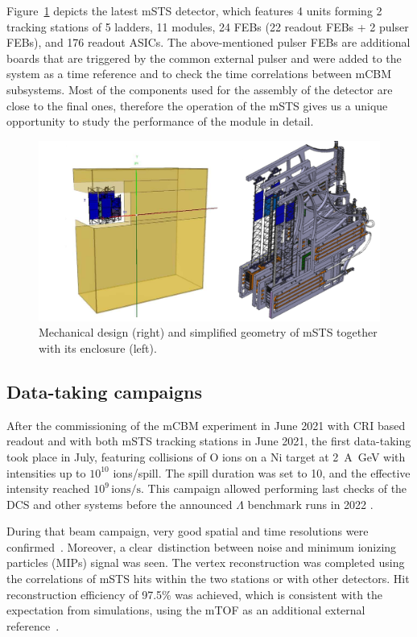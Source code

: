 Figure~\ref{fig_mSTS} depicts the latest \gls{mSTS} detector, which features \num{4} units forming \num{2} tracking stations of \num{5} ladders, \num{11} modules, \num{24} \glspl{FEB} (\num{22} readout \glspl{FEB} + \num{2} pulser \glspl{FEB}), and \num{176} readout \glspl{ASIC}. The above-mentioned pulser \glspl{FEB} are additional boards that are triggered by the common external pulser and were added to the system as a time reference and to check the time correlations between \gls{mCBM} subsystems.  Most of the components used for the assembly of the detector are close to the final ones, therefore the operation of the \gls{mSTS} gives us a unique opportunity to study the performance of the module in detail.
\begin{figure}[!h]
\centering
\includegraphics[width=0.75\columnwidth]{Chapter6/DCS/images/mSTS_mech.png}
\caption{Mechanical design (right) and simplified geometry of \gls{mSTS} together with its enclosure (left).}
\label{fig_mSTS}
\end{figure}
\newpage
\subsection{Data-taking campaigns}
After the commissioning of the \gls{mCBM} experiment in June \num{2021} with \gls{CRI} based readout and with both \gls{mSTS} tracking stations in June 2021, the first data-taking took place in July, featuring collisions of O ions on a Ni target at \SI{2}{\A\giga\eV} with intensities up to $10^{10}$ ions/spill. The spill duration was set to \SI{10}{\sec}, and the effective intensity reached $10^{9}\,\mathrm{ions/s}$. This campaign allowed performing last checks of the \gls{DCS} and other systems before the announced $\Lambda$ benchmark runs in 2022 \cite{sturm3}.

During that beam campaign, very good spatial and time resolutions were confirmed~\cite{dario1}. Moreover, a clear distinction between noise and minimum ionizing particles (\glspl{MIP}) signal was seen.
The vertex reconstruction was completed using the correlations of \gls{mSTS} hits within the two stations or with other detectors. Hit reconstruction efficiency of 97.5\% was achieved, which is consistent with the expectation from simulations, using the mTOF as an additional external reference~\cite{dario1}.

